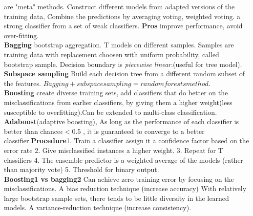 \documentclass[cheatsheet.tex]{subfiles}
\begin{document}
are  "meta" methods. Construct different models from adapted versions of the training data, Combine the predictions by averaging voting, weighted voting. a strong classifier from a set of weak classifiers. \textbf{Pros} improve performance, avoid over-fitting. 
\\
\textbf{Bagging} bootstrap aggregation. T models on different samples. Samples are training data with replacement choosen with uniform probability, called bootstrap sample. Decision boundary is \textit{piecewise linear}.(useful for tree model). \textbf{Subspace sampling} Build each decision tree from a different random subset of the features. $Bagging + subspace sampling = random forests method$. 
\\
\textbf{Boosting} create diverse training sets, add classifiers that do better on the misclassifications from earlier classifiers, by giving them a higher weight(less susceptible to overfitting).Can be extended to multi-class classification. \textbf{Adaboost}(adaptive boosting), As long as the performance of each classifier is better than chance$\epsilon<0.5$ , it is guaranteed to converge to a better classifier.\textbf{Procedure}1. Train a classifier assign it a confidence factor based on the error rate 2. Give misclassified instances a higher weight. 3. Repeat for T classifiers 4. The ensemble predictor is a weighted average of the models (rather than majority vote) 5. Threshold for binary output.
\\
\textbf{Boosting1 vs bagging2}  Can achieve zero training error by focusing on the misclassifications. A bias reduction technique (increase accuracy)  With relatively large bootstrap sample sets, there tends to be little diversity in the learned models. A variance-reduction technique (increase consistency).
\\
\end{document}
